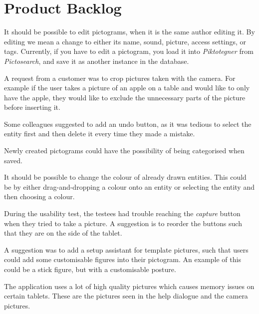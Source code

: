 \chapter{Product Backlog}\label{app:further-deflopment}
\begin{description}[style=nextline]
\item[Editing pictograms]
It should be possible to edit pictograms, when it is the same author editing it. 
By editing we mean a change to either its name, sound, picture, access settings, or tags.
Currently, if you have to edit a pictogram, you load it into \textit{Piktotegner} from \textit{Pictosearch}, and save it as another instance in the database.

\item[Crop camera pictures]
A request from a customer was to crop pictures taken with the camera.
For example if the user takes a picture of an apple on a table and would like to only have the apple, they would like to exclude the unnecessary parts of the picture before inserting it.

\item[Undo button]
Some colleagues suggested to add an undo button, as it was tedious to select the entity first and then delete it every time they made a mistake.

\item[Categorising pictograms]
Newly created pictograms could have the possibility of being categorised when saved.

\item[Change colour of drawn entities]
It should be possible to change the colour of already drawn entities.
This could be by either drag-and-dropping a colour onto an entity or selecting the entity and then choosing a colour.

\item[Camera dialogue buttons]
During the usability test, the testees had trouble reaching the \textit{capture} button when they tried to take a picture.
A suggestion is to reorder the buttons such that they are on the side of the tablet.

\item[Template pictures]
A suggestion was to add a setup assistant for template pictures, such that users could add some customisable figures into their pictogram.
An example of this could be a stick figure, but with a customisable posture. 

\item[Memory issues]
The application uses a lot of high quality pictures which causes memory issues on certain tablets. 
These are the pictures seen in the help dialogue and the camera pictures.


\end{description}

